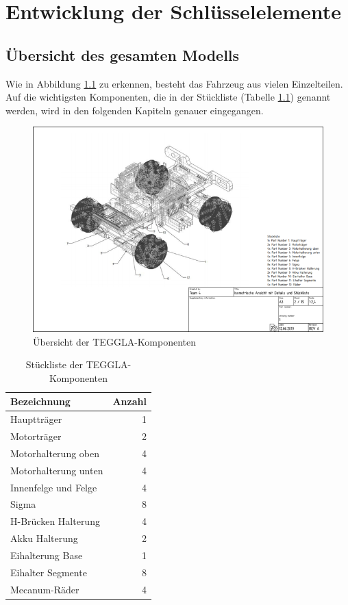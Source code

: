\chapter{Entwicklung der Schlüsselelemente}
\section{Übersicht des gesamten Modells}
Wie in Abbildung \ref{bild:tegglaoverview} zu erkennen, besteht das Fahrzeug aus vielen Einzelteilen. 
Auf die wichtigsten Komponenten, die in der Stückliste (Tabelle \ref{table:tegglaoverview}) genannt werden, wird in den folgenden Kapiteln genauer eingegangen.
\begin{figure}[!ht]
	\centering
	\includegraphics[width=\textwidth]{bilder/overview.png}
	\caption{Übersicht der TEGGLA-Komponenten}
	\label{bild:tegglaoverview}
\end{figure}

\begin{table}[!ht]
\centering
\begin{tabular}{lr}
	Bezeichnung & Anzahl \\ 
	\midrule[3pt] 
	Hauptträger            & 1 \\ \midrule
	Motorträger            & 2 \\ \midrule
	Motorhalterung oben    & 4 \\ \midrule
	Motorhalterung unten   & 4 \\ \midrule
	Innenfelge und Felge   & 4 \\ \midrule
	Sigma                  & 8 \\ \midrule
	H-Brücken Halterung    & 4 \\ \midrule
	Akku Halterung         & 2 \\ \midrule
	Eihalterung Base       & 1 \\ \midrule
	Eihalter Segmente      & 8 \\ \midrule
	Mecanum-Räder          & 4
\end{tabular} 
\caption{Stückliste der TEGGLA-Komponenten} 
\label{table:tegglaoverview}
\end{table} 



